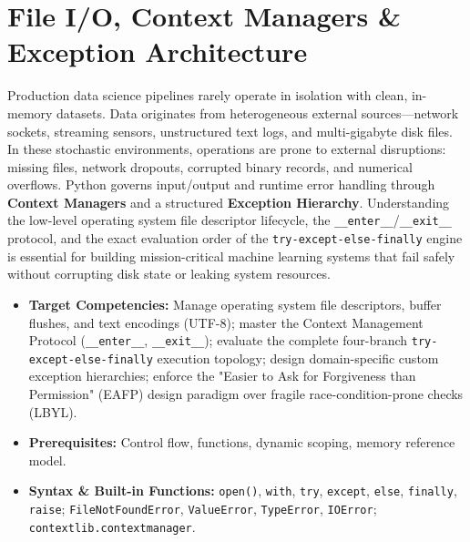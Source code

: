 \chapter{File I/O, Context Managers \& Exception Architecture}

Production data science pipelines rarely operate in isolation with clean, in-memory datasets. Data originates from heterogeneous external sources---network sockets, streaming sensors, unstructured text logs, and multi-gigabyte disk files. In these stochastic environments, operations are prone to external disruptions: missing files, network dropouts, corrupted binary records, and numerical overflows. Python governs input/output and runtime error handling through \textbf{Context Managers} and a structured \textbf{Exception Hierarchy}. Understanding the low-level operating system file descriptor lifecycle, the \texttt{\_\_enter\_\_}/\texttt{\_\_exit\_\_} protocol, and the exact evaluation order of the \texttt{try-except-else-finally} engine is essential for building mission-critical machine learning systems that fail safely without corrupting disk state or leaking system resources.

\vspace{0.5cm}
\begin{tcolorbox}[colback=primarylight, colframe=primarydark, title={\textbf{Executive Roadmap \& Learning Objectives}}]
\begin{itemize}
    \item \textbf{Target Competencies:} Manage operating system file descriptors, buffer flushes, and text encodings (UTF-8); master the Context Management Protocol (\texttt{\_\_enter\_\_}, \texttt{\_\_exit\_\_}); evaluate the complete four-branch \texttt{try-except-else-finally} execution topology; design domain-specific custom exception hierarchies; enforce the "Easier to Ask for Forgiveness than Permission" (EAFP) design paradigm over fragile race-condition-prone checks (LBYL).
    \item \textbf{Prerequisites:} Control flow, functions, dynamic scoping, memory reference model.
    \item \textbf{Syntax \& Built-in Functions:} \texttt{open()}, \texttt{with}, \texttt{try}, \texttt{except}, \texttt{else}, \texttt{finally}, \texttt{raise}; \texttt{FileNotFoundError}, \texttt{ValueError}, \texttt{TypeError}, \texttt{IOError}; \texttt{contextlib.contextmanager}.
\end{itemize}
\end{tcolorbox}

